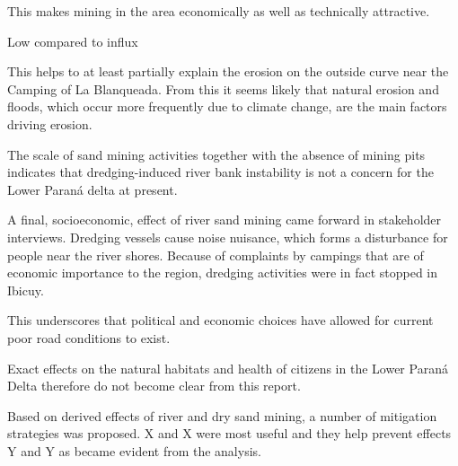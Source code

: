 This makes mining in the area economically as well as technically attractive.


Low compared to influx







This helps to at least partially explain the erosion on the outside curve near the Camping of La Blanqueada. From this it seems likely that natural erosion and floods, which occur more frequently due to climate change, are the main factors driving erosion.

The scale of sand mining activities together with the absence of mining pits indicates that dredging-induced river bank instability is not a concern for the Lower Paraná delta at present.

 A final, socioeconomic, effect of river sand mining came forward in stakeholder interviews. Dredging vessels cause noise nuisance, which forms a disturbance for people near the river shores. Because of complaints by campings that are of economic importance to the region, dredging activities were in fact stopped in Ibicuy.


This underscores that political and economic choices have allowed for current poor road conditions to exist.

Exact effects on the natural habitats and health of citizens in the Lower Paraná Delta therefore do not become clear from this report.

Based on derived effects of river and dry sand mining, a number of mitigation strategies was proposed. X and X were most useful and they help prevent effects Y and Y as became evident from the analysis.

